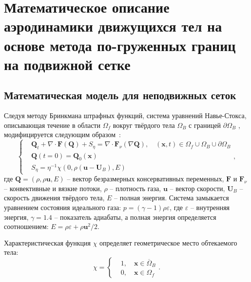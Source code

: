 \chapter{Математическое описание аэродинамики движущихся тел на основе метода по-груженных границ на подвижной сетке} \label{ch:ch1}

\section{Математическая модель для неподвижных сеток} \label{sec:ch1/sec1}

	Следуя методу Бринкмана штрафных функций, система уравнений Навье-Стокса, описывающая течение в области $\Omega_f$ вокруг твёрдого тела $\Omega_B$ с границей $\partial \Omega_B$ , модифицируется следующим образом~\cite{mittal2005immersed, boiron2009high}:
	\begin{equation}
	\left\{
	\begin{aligned}
	&\mathbf{Q}_t + \nabla \cdot \mathbf{F}(\mathbf{Q})+S_{\eta} = \nabla\cdot\mathbf{F}_{\nu}(\nabla \mathbf{Q}), \quad (\mathbf{x}, t) \in \Omega_f \cup \Omega_B \cup \partial\Omega_B\\
	&\mathbf{Q}(t=0) = \mathbf{Q}_0(\mathbf{x})\\
	&S_{\eta} = \eta^{-1} \chi (0, \rho(\mathbf{u} -\mathbf{U}_B), E)
	\end{aligned}
	\right. ,
	\label{eq:NS}
	\end{equation}
	где   $\mathbf{Q} = (\rho, \rho\mathbf{u}, E)$ – вектор безразмерных консервативных переменных,  $\mathbf{F}$ и  $\mathbf{F}_{\nu}$ – конвективные и вязкие потоки, $\rho$ – плотность газа,  $\mathbf{u}$ – вектор скорости, $\mathbf{U}_B$   – скорость движения твёрдого тела,  $E$ – полная энергия. Система замыкается уравнением состояния идеального газа: $p = (\gamma - 1)\rho \varepsilon$, где $\varepsilon$  – внутренняя энергия, $\gamma = 1.4$  – показатель адиабаты, а полная энергия определяется соотношением:  $E = \rho \varepsilon + \rho\mathbf{u}^2/2$.
	
	Характеристическая функция $\chi$ определяет геометрическое место обтекаемого тела:
	\begin{equation}
	\chi = \left\{
	\begin{aligned}
	&1, \quad \mathbf{x}\in \overline{\Omega}_B\\
	&0, \quad \mathbf{x}\in \Omega_f
	\end{aligned}
	\right. .
	\label{eq:chi}
	\end{equation}
	
